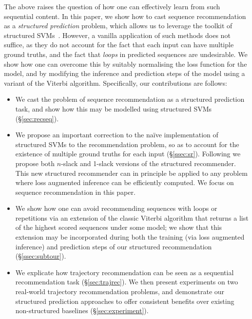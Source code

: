The above raises the question of how one can effectively learn from such sequential content.
In this paper, we show how to cast sequence recommendation as a \emph{structured prediction} problem,
which allows us to leverage the toolkit of structured SVMs~\citep{tsochantaridis2005large}.
However, a vanilla application of such methods does not suffice,
as they do not account for the fact that each input can have multiple ground truths,
and the fact that \emph{loops} in predicted sequences are undesirable.
We show how one can overcome this by
suitably normalising the loss function for the model,
and by modifying the inference and prediction steps of the model using a variant of the Viterbi algorithm.
Specifically, our contributions are follows:
\begin{itemize}[noitemsep]\itemmoveup
	\item We cast the problem of sequence recommendation as a structured prediction task, and show how this may be modelled using structured SVMs (\S\ref{sec:recseq}).
	\item We propose an important correction to the na\"{i}ve implementation of structured SVMs to the recommendation problem, so as to account for the existence of multiple ground truths for each input (\S\ref{ssec:sr}). Following \citet{joachims2009cutting} we propose both $n$-slack and 1-slack versions of the structured recommender. This new structured recommender can in principle be applied to any problem where loss augmented inference can be efficiently computed. We focus on sequence recommendation in this paper.
	\item We show how one can avoid recommending sequences with loops or repetitions via an extension of the classic Viterbi algorithm that returns a list of the highest scored sequences under some model; we show that this extension may be incorporated during both the training (via loss augmented inference) and prediction steps of our structured recommendation (\S\ref{ssec:subtour}).
	\item We explicate how trajectory recommendation can be seen as a sequential recommendation task (\S\ref{sec:trajrec}). We then present experiments on two real-world trajectory recommendation problems, and demonstrate our structured prediction approaches to offer consistent benefits over existing non-structured baselines (\S\ref{sec:experiment}).\itemmoveup
\end{itemize}

